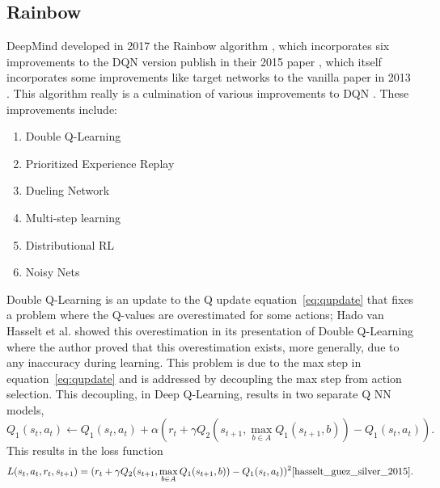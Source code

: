 \subsection{Rainbow}

DeepMind developed in 2017 the Rainbow algorithm \cite{hessel_modayil_hasselt_schaul_ostrovski_dabney_horgan_piot_azar_silver_et}, which incorporates six improvements to the DQN version publish in their 2015 paper \cite{mnih_kavukcuoglu_silver_rusu_veness_bellemare_graves_riedmiller_fidjeland_ostrovski_et}, which itself incorporates some improvements like target networks to the vanilla paper in 2013 \cite{mnih_kavukcuoglu_silver_graves_antonoglou_wierstra_riedmiller_2013}. This algorithm really is a culmination of various improvements to DQN \cite{hessel_modayil_hasselt_schaul_ostrovski_dabney_horgan_piot_azar_silver_et}. These improvements include:
\begin{enumerate}[itemsep=0mm]
	\item Double Q-Learning
	\item Prioritized Experience Replay
	\item Dueling Network
	\item Multi-step learning
	\item Distributional RL
	\item Noisy Nets
\end{enumerate}

Double Q-Learning is an update to the Q update equation~\ref{eq:qupdate} that fixes a problem where the Q-values are overestimated for some actions; Hado van Hasselt et al. showed this overestimation in its presentation of Double Q-Learning where the author proved that this overestimation exists, more generally, due to any inaccuracy during learning. This problem is due to the max step in equation~\ref{eq:qupdate} and  is addressed by decoupling the max step from action selection. This decoupling, in Deep Q-Learning, results in two separate Q NN models, $$Q_1(s_t, a_t)\leftarrow Q_1(s_t, a_t)+\alpha (r_t+\gamma Q_2(s_{t+1}, \max_{b\in A}Q_1(s_{t+1}, b)) - Q_1(s_t, a_t)).$$ This results in the loss function $$L(s_t, a_t, r_t, s_{t+1})=(r_t+\gamma Q_2(s_{t+1}, \max_{b\in A}Q_1(s_{t+1}, b)) - Q_1(s_t, a_t))^2 \cite{hasselt_guez_silver_2015}.$$

